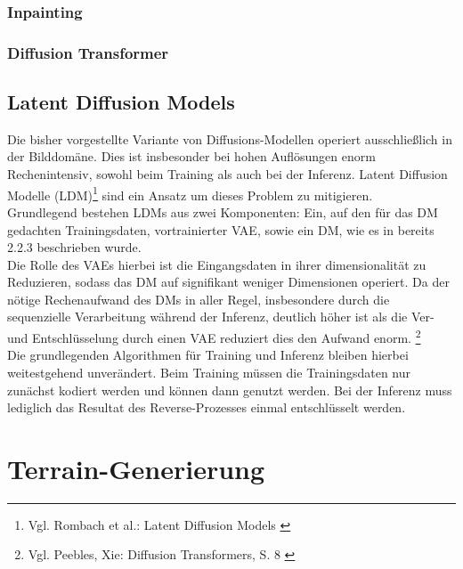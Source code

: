 \subsubsection{Inpainting}


\subsubsection{Diffusion Transformer}


\subsection{Latent Diffusion Models}

Die bisher vorgestellte Variante von Diffusions-Modellen operiert ausschließlich in der Bilddomäne. Dies ist insbesonder bei hohen Auflösungen enorm Rechenintensiv, sowohl beim Training als auch bei der Inferenz. Latent Diffusion Modelle (LDM)\footnote{
    Vgl. Rombach et al.: Latent Diffusion Models
    \cite{rombach2022high}
}  sind ein Ansatz um dieses Problem zu mitigieren. \\
Grundlegend bestehen LDMs aus zwei Komponenten: Ein, auf den für das DM gedachten Trainingsdaten, vortrainierter VAE, sowie ein DM, wie es in bereits 2.2.3 beschrieben wurde. \\
Die Rolle des VAEs hierbei ist die Eingangsdaten in ihrer dimensionalität zu Reduzieren, sodass das DM auf signifikant weniger Dimensionen operiert. Da der nötige Rechenaufwand des DMs in aller Regel, insbesondere durch die sequenzielle Verarbeitung während der Inferenz, deutlich höher ist als die Ver- und Entschlüsselung durch einen VAE reduziert dies den Aufwand enorm.  \footnote{
    Vgl. Peebles, Xie: Diffusion Transformers, S. 8
    \cite{peebles2023scalable}
} \\
Die grundlegenden Algorithmen für Training und Inferenz bleiben hierbei weitestgehend unverändert. Beim Training müssen die Trainingsdaten nur zunächst kodiert werden und können dann genutzt werden. Bei der Inferenz muss lediglich das Resultat des Reverse-Prozesses einmal entschlüsselt werden.


\section{Terrain-Generierung}

